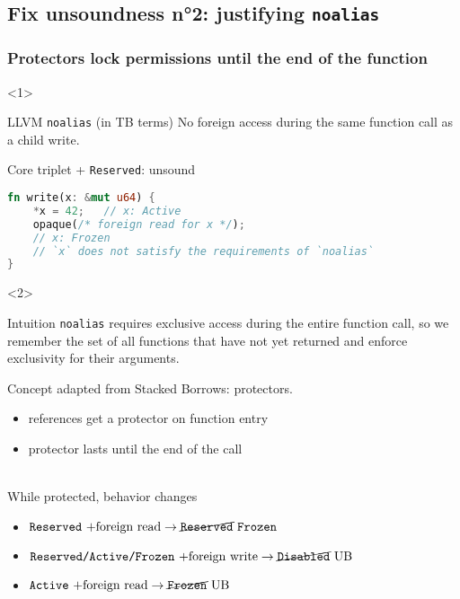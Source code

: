 \subsection{Fix unsoundness n°2: justifying \texttt{noalias}}

\begin{frame}[fragile]
    \frametitle{Protectors lock permissions until the end of the function}
    \begin{onlyenv}<1>
        \begin{alertblock}{LLVM \texttt{noalias} (in TB terms)}
            No foreign access during the same function call as a child write.
        \end{alertblock}
        \begin{block}{Core triplet + \texttt{Reserved}: unsound}
            \begin{lstlisting}[language=rust, escapechar=@]
fn write(x: &mut u64) {
    *x = 42;   // x: Active
    opaque(/* foreign read for x */);
    // x: Frozen
    // `x` does not satisfy the requirements of `noalias`
}
            \end{lstlisting}
        \end{block}
    \end{onlyenv}

    \begin{onlyenv}<2>
        \begin{exampleblock}{Intuition}
            \texttt{noalias} requires exclusive access during the entire
            function call, so we remember the set of all functions that have not yet
            returned and enforce exclusivity for their arguments.
        \end{exampleblock}

        Concept adapted from Stacked Borrows: protectors.
        \begin{itemize}
            \item references get a protector on function entry
            \item protector lasts until the end of the call
        \end{itemize}
        ~\\
        While protected, behavior changes
        \begin{itemize}
            \item \(\texttt{Reserved}~\text{+foreign read}\to \cancel{\texttt{Reserved}}~\texttt{Frozen}\)
            \item \(\texttt{Reserved/Active/Frozen}~\text{+foreign write} \to \cancel{\texttt{Disabled}}~\text{UB}\)
            \item \(\texttt{Active}~\text{+foreign read}\to \cancel{\texttt{Frozen}}~\text{UB}\)
        \end{itemize}~\\
    \end{onlyenv}


\end{frame}
